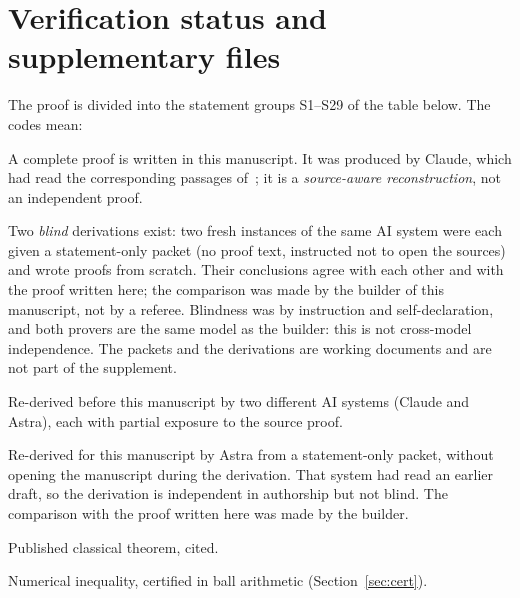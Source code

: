 \documentclass[11pt]{article}
\theoremstyle{definition}
\begin{document}
\section{Verification status and supplementary files}\label{sec:verification}
The proof is divided into the statement groups S1--S29 of the table below. The codes mean:
\begin{description}[leftmargin=2.2em,style=nextline]
\item[W] A complete proof is written in this manuscript. It was produced by Claude, which had read the
corresponding passages of~\cite{OAI,Base}; it is a \emph{source-aware reconstruction}, not an independent proof.
\item[B] Two \emph{blind} derivations exist: two fresh instances of the same AI system were each given a
statement-only packet (no proof text, instructed not to open the sources) and wrote proofs from scratch. Their
conclusions agree with each other and with the proof written here; the comparison was made by the builder of this
manuscript, not by a referee. Blindness was by instruction and self-declaration, and both provers are the same
model as the builder: this is not cross-model independence. The packets and the derivations are working
documents and are not part of the supplement.
\item[R] Re-derived before this manuscript by two different AI systems (Claude and Astra),
each with partial exposure to the source proof.
\item[X] Re-derived for this manuscript by Astra from a statement-only packet, without
opening the manuscript during the derivation. That system had read an earlier draft, so the derivation is
independent in authorship but not blind. The comparison with the proof written here was made by the builder.
\item[C] Published classical theorem, cited.
\item[N] Numerical inequality, certified in ball arithmetic (Section~\ref{sec:cert}).
\end{description}
\end{document}
